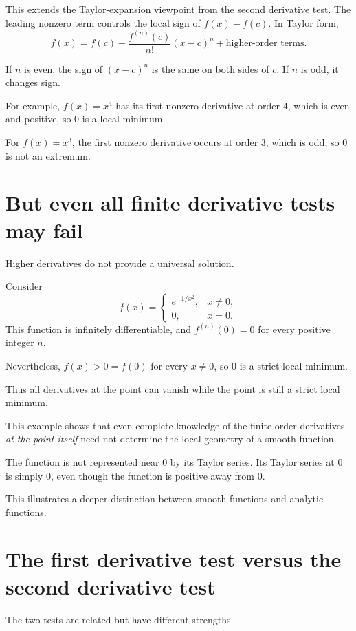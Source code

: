 \documentclass{essay}
\begin{document}
This extends the Taylor-expansion viewpoint from the second derivative test. The leading nonzero term controls the local sign of \(f(x)-f(c)\). In Taylor form,
\[
f(x)
=
f(c)
+
\frac{f^{(n)}(c)}{n!}(x-c)^n
+
\text{higher-order terms}.
\]

If \(n\) is even, the sign of \((x-c)^n\) is the same on both sides of \(c\). If \(n\) is odd, it changes sign.

For example, \(f(x)=x^4\) has its first nonzero derivative at order \(4\), which is even and positive, so \(0\) is a local minimum.

For \(f(x)=x^3\), the first nonzero derivative occurs at order \(3\), which is odd, so \(0\) is not an extremum.

\section{But even all finite derivative tests may fail}

Higher derivatives do not provide a universal solution.

Consider
\[
f(x)=
\begin{cases}
e^{-1/x^2}, & x\neq0,\\
0, & x=0.
\end{cases}
\]
This function is infinitely differentiable, and \(f^{(n)}(0)=0\) for every positive integer \(n\).

Nevertheless, \(f(x)>0=f(0)\) for every \(x\neq0\), so \(0\) is a strict local minimum.

Thus all derivatives at the point can vanish while the point is still a strict local minimum.

This example shows that even complete knowledge of the finite-order derivatives \emph{at the point itself} need not determine the local geometry of a smooth function.

The function is not represented near \(0\) by its Taylor series. Its Taylor series at \(0\) is simply \(0\), even though the function is positive away from \(0\).

This illustrates a deeper distinction between smooth functions and analytic functions.

\section{The first derivative test versus the second derivative test}

The two tests are related but have different strengths.
\end{document}
